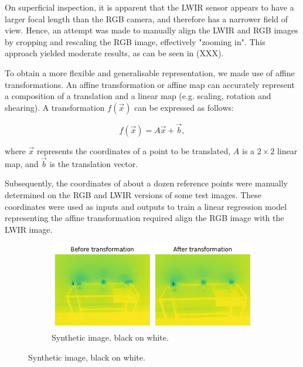 \documentclass{l4proj}
\begin{document}
On superficial inspection, it is apparent that the LWIR sensor appears to have a larger focal length than the RGB camera, and therefore has a narrower field of view. Hence, an attempt was made to manually align the LWIR and RGB images by cropping and rescaling the RGB image, effectively "zooming in". This approach yielded moderate results, as can be seen in (XXX).

To obtain a more flexible and generalisable representation, we made use of affine transformations. An affine transformation or affine map can accurately represent a composition of a translation and a linear map (e.g. scaling, rotation and shearing). A transformation $f(\vec{x})$ can be expressed as follows:

\begin{equation}
  f(\vec{x}) = A \vec{x} + \vec{b},
\end{equation}

where $\vec{x}$ represents the coordinates of a point to be translated, $A$ is a $2 \times 2$ linear map, and $\vec{b}$ is the translation vector.

Subsequently, the coordinates of about a dozen reference points were manually determined on the RGB and LWIR versions of some test images. These coordinates were used as inputs and outputs to train a linear regression model representing the affine transformation required align the RGB image with the LWIR image. 



\begin{figure}[ht]
  \centering
  \begin{subfigure}[h!]{0.9\textwidth}
    \includegraphics[width=\textwidth]{images/registration/linear_model_alignment.png}
    \caption{Synthetic image, black on white.}
    \label{fig:linear_trans_before_after}
  \end{subfigure}
\end{figure}
\end{document}
